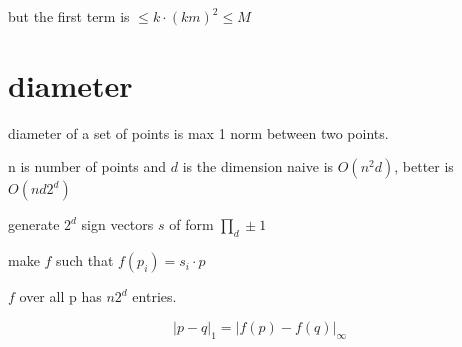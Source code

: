 \documentclass{article}
\theoremstyle{definition}
\newcommand{\abs}[1]{\left| #1 \right|}
\begin{document}
but the first term is  \(\leq k\cdot (km)^2\leq M\)



\section{diameter}

diameter of a set of points is max 1 norm between two points. 


n is number of points and \(d\) is the dimension
naive is \(O(n^2d)\), better is \(O(nd2^d)\)

generate \(2^d\) sign vectors \(s\) of form \(\prod_d \pm 1 \)

make \(f\) such that \(f(p_i) = s_i\cdot p\)

\(f\) over all p has \(n 2^d\) entries. 

\begin{equation}
    \abs{p-q}_1 = \abs{f(p)-f(q)}_\infty
\end{equation}
\end{document}
